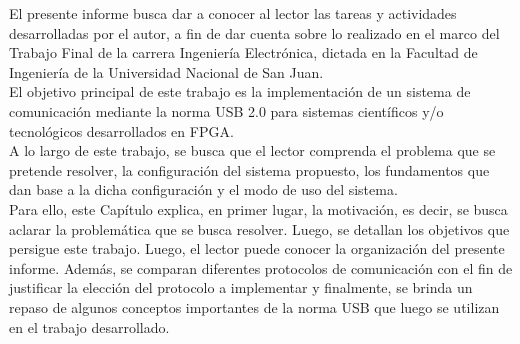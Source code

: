 El presente informe busca dar a conocer al lector las tareas y actividades desarrolladas por el autor, a fin de dar cuenta sobre lo realizado en el marco del Trabajo Final de la carrera Ingeniería Electrónica, dictada en la Facultad de Ingeniería de la Universidad Nacional de San Juan.\\

El objetivo principal de este trabajo es la implementación de un sistema de comunicación mediante la norma USB 2.0 para sistemas científicos y/o tecnológicos desarrollados en FPGA.\\

A lo largo de este trabajo, se busca que el lector comprenda el problema que se pretende resolver, la configuración del sistema propuesto, los fundamentos que dan base a la dicha configuración y el modo de uso del sistema.\\

Para ello, este Capítulo explica, en primer lugar, la motivación, es decir, se busca aclarar la problemática que se busca resolver. Luego, se detallan los objetivos que persigue este trabajo. Luego, el lector puede conocer la organización del presente informe. Además, se comparan diferentes protocolos de comunicación con el fin de justificar la elección del protocolo a implementar y finalmente, se brinda un repaso de algunos conceptos importantes de la norma USB que luego se utilizan en el trabajo desarrollado.\\ 
